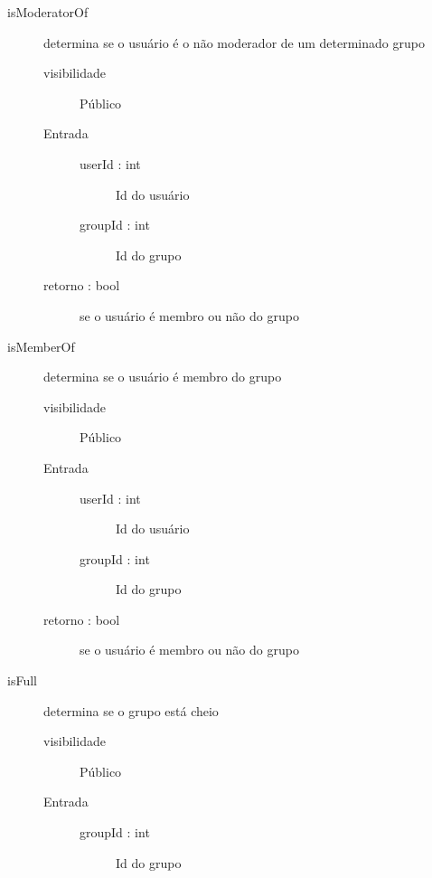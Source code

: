 \documentclass[a4paper]{article}
\begin{document}
\begin{description}
\begin{description}
			\end{description} %
			
			\item [isModeratorOf] determina se o usuário é o não moderador de um determinado grupo
			\begin{description} %
			 \item [visibilidade] Público
			 \item [Entrada] \mbox{}
				\begin{description} %
				 \item [userId : int] Id do usuário
				 \item [groupId : int] Id do grupo
				\end{description} %
				
			 \item [retorno : bool ] se o usuário é membro ou não do grupo
				
			\end{description} %
			
			\item [isMemberOf] determina se o usuário é membro do grupo
			\begin{description} %
			 \item [visibilidade] Público
			 \item [Entrada] \mbox{}
				\begin{description} %
				 \item [userId : int] Id do usuário
				 \item [groupId : int] Id do grupo
				\end{description} %
				
			 \item [retorno : bool ] se o usuário é membro ou não do grupo
				
			\end{description} %
			
			\item [isFull] determina se o grupo está cheio
			\begin{description} %
			 \item [visibilidade] Público
			 \item [Entrada] \mbox{}
				\begin{description} %
				 \item [groupId : int] Id do grupo
				\end{description} %
				

\end{description}
\end{description}
\end{document}
